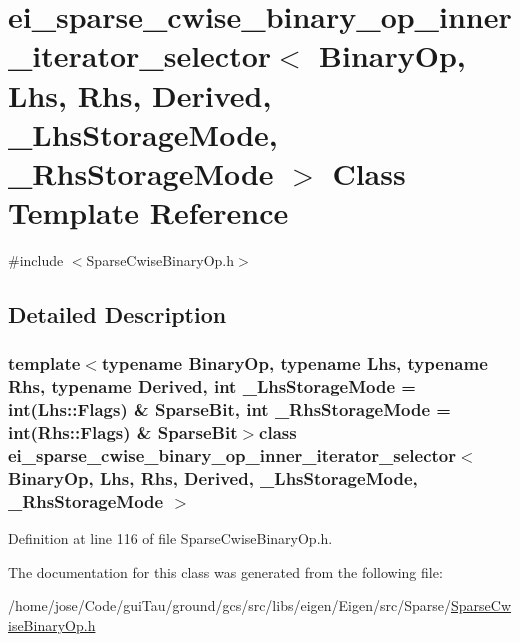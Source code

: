\hypertarget{classei__sparse__cwise__binary__op__inner__iterator__selector}{\section{ei\-\_\-sparse\-\_\-cwise\-\_\-binary\-\_\-op\-\_\-inner\-\_\-iterator\-\_\-selector$<$ Binary\-Op, Lhs, Rhs, Derived, \-\_\-\-Lhs\-Storage\-Mode, \-\_\-\-Rhs\-Storage\-Mode $>$ Class Template Reference}
\label{classei__sparse__cwise__binary__op__inner__iterator__selector}
}


{\ttfamily \#include $<$Sparse\-Cwise\-Binary\-Op.\-h$>$}



\subsection{Detailed Description}
\subsubsection*{template$<$typename Binary\-Op, typename Lhs, typename Rhs, typename Derived, int \-\_\-\-Lhs\-Storage\-Mode = int(\-Lhs\-::\-Flags) \& Sparse\-Bit, int \-\_\-\-Rhs\-Storage\-Mode = int(\-Rhs\-::\-Flags) \& Sparse\-Bit$>$class ei\-\_\-sparse\-\_\-cwise\-\_\-binary\-\_\-op\-\_\-inner\-\_\-iterator\-\_\-selector$<$ Binary\-Op, Lhs, Rhs, Derived, \-\_\-\-Lhs\-Storage\-Mode, \-\_\-\-Rhs\-Storage\-Mode $>$}



Definition at line 116 of file Sparse\-Cwise\-Binary\-Op.\-h.



The documentation for this class was generated from the following file\-:\begin{DoxyCompactItemize}
\item 
/home/jose/\-Code/gui\-Tau/ground/gcs/src/libs/eigen/\-Eigen/src/\-Sparse/\hyperlink{_sparse_cwise_binary_op_8h}{Sparse\-Cwise\-Binary\-Op.\-h}\end{DoxyCompactItemize}
